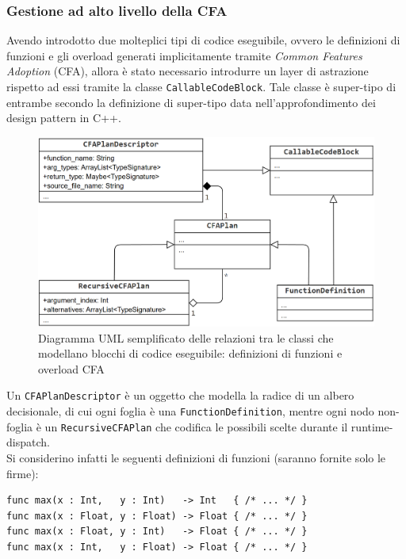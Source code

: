 \subsubsection{Gestione ad alto livello della CFA}
Avendo introdotto due molteplici tipi di codice eseguibile, ovvero le definizioni di funzioni e gli overload generati implicitamente 
tramite \textit{Common Features Adoption} (CFA), allora è stato necessario introdurre un layer di astrazione rispetto ad essi 
tramite la classe \texttt{CallableCodeBlock}. Tale classe è super-tipo di entrambe secondo la definizione di super-tipo 
data nell'approfondimento dei design pattern in C++. \\

\begin{figure}[h]
    \centering
        \includegraphics[width=1\textwidth]{../../Assets/CFA_UML.png}
    \caption{
        \centering
        Diagramma UML semplificato delle relazioni tra le classi che 
        modellano blocchi di codice eseguibile: definizioni di funzioni e overload CFA}
\end{figure}
\vspace{0.5cm}

Un \texttt{CFAPlanDescriptor} è un oggetto che modella la radice di un albero decisionale, di cui ogni foglia è una \texttt{FunctionDefinition}, 
mentre ogni nodo non-foglia è un \texttt{RecursiveCFAPlan} che codifica le possibili scelte durante il runtime-dispatch. \\

Si considerino infatti le seguenti definizioni di funzioni (saranno fornite solo le firme): \\

\vspace{0.5cm}
\begin{lstlisting}[frame=single]
func max(x : Int,   y : Int)   -> Int   { /* ... */ }
func max(x : Float, y : Float) -> Float { /* ... */ }
func max(x : Float, y : Int)   -> Float { /* ... */ }
func max(x : Int,   y : Float) -> Float { /* ... */ }
\end{lstlisting}

